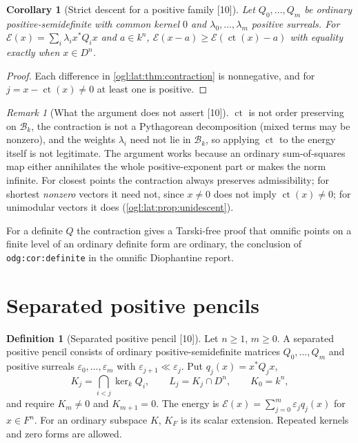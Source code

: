 \documentclass[11pt,oneside]{article}
\numberwithin{equation}{section}
\newtheorem{corollary}[corollary]{Corollary}
\theoremstyle{definition}
\newtheorem{definition}[definition]{Definition}
\theoremstyle{remark}
\newtheorem{remark}[remark]{Remark}
\newcommand{\Bk}{\mathcal B_k}
\newcommand{\cE}{\mathcal E}
\newcommand{\ct}{\operatorname{ct}}
\newcommand{\src}[1]{\textup{\textsf{\small[#1]}}}
\newcommand{\replabel}[1]{\nolinkurl{#1}}
\begin{document}
\begin{corollary}[Strict descent for a positive family \src{10}]\label{ogl:lat:cor:strictdescent}
Let $Q_0,\dots,Q_m$ be ordinary positive-semidefinite with common kernel $0$ and
$\lambda_0,\dots,\lambda_m$ positive surreals. For
$\cE(x)=\sum_i\lambda_ix^*Q_ix$ and $a\in k^n$, $\cE(x-a)\ge\cE(\ct(x)-a)$ with
equality exactly when $x\in D^n$.
\end{corollary}
\begin{proof}
Each difference in \cref{ogl:lat:thm:contraction} is nonnegative, and for
$j=x-\ct(x)\ne0$ at least one is positive.
\end{proof}

\begin{remark}[What the argument does not assert \src{10}]\label{ogl:lat:rem:notorder}
$\ct$ is not order preserving on $\Bk$, the contraction is not a Pythagorean
decomposition (mixed terms may be nonzero), and the weights $\lambda_i$ need not
lie in $\Bk$, so applying $\ct$ to the energy itself is not legitimate. The
argument works because an ordinary sum-of-squares map either annihilates the
whole positive-exponent part or makes the norm infinite. For closest points the
contraction always preserves admissibility; for shortest \emph{nonzero} vectors
it need not, since $x\ne0$ does not imply $\ct(x)\ne0$; for unimodular vectors
it does (\cref{ogl:lat:prop:unidescent}).
\end{remark}

For a definite $Q$ the contraction gives a Tarski-free proof that omnific points
on a finite level of an ordinary definite form are ordinary, the conclusion of
\replabel{odg:cor:definite} in the omnific Diophantine report.

\section{Separated positive pencils}\label{ogl:lat:sec:pencil}

\begin{definition}[Separated positive pencil \src{10}]\label{ogl:lat:def:pencil}
Let $n\ge1$, $m\ge0$. A separated positive pencil consists of ordinary
positive-semidefinite matrices $Q_0,\dots,Q_m$ and positive surreals
$\varepsilon_0,\dots,\varepsilon_m$ with $\varepsilon_{j+1}\ll\varepsilon_j$.
Put $q_j(x)=x^*Q_jx$,
\[
 K_j=\bigcap_{i<j}\ker_kQ_i,\qquad L_j=K_j\cap D^n,\qquad K_0=k^n,
\]
and require $K_m\ne0$ and $K_{m+1}=0$. The energy is
$\cE(x)=\sum_{j=0}^m\varepsilon_jq_j(x)$ for $x\in F^n$. For an ordinary
subspace $K$, $K_F$ is its scalar extension. Repeated kernels and zero forms are
allowed.
\end{definition}
\end{document}

